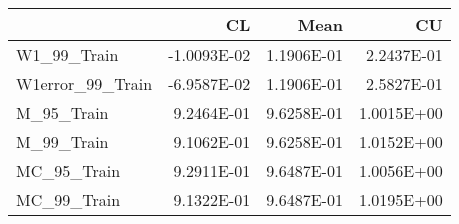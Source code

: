 \begin{tabular}{lrrr}
\toprule
{} &          CL &       Mean &         CU \\
\midrule
W1\_99\_Train      & -1.0093E-02 & 1.1906E-01 & 2.2437E-01 \\
W1error\_99\_Train & -6.9587E-02 & 1.1906E-01 & 2.5827E-01 \\
M\_95\_Train       &  9.2464E-01 & 9.6258E-01 & 1.0015E+00 \\
M\_99\_Train       &  9.1062E-01 & 9.6258E-01 & 1.0152E+00 \\
MC\_95\_Train      &  9.2911E-01 & 9.6487E-01 & 1.0056E+00 \\
MC\_99\_Train      &  9.1322E-01 & 9.6487E-01 & 1.0195E+00 \\
\bottomrule
\end{tabular}
